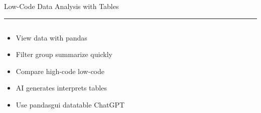 \documentclass[aspectratio=169]{beamer}
\newcommand{\TitleFont}{\rmfamily}
\begin{document}
\begin{frame}[t]{}
  \vspace*{0.5cm}
  {\TitleFont\fontsize{18}{22}\selectfont\color{LUBronze}Low-Code Data Analysis with Tables\par}
  \vspace{0.3em}
  {\color{LUBronze}\rule{\linewidth}{0.8pt}}\par
  \vspace{0.2cm}
  \begin{columns}[t]
    \begin{column}[t]{0.4\textwidth}
      \vspace*{0pt}
      \begin{itemize}\setlength\itemsep{0.65em}
        \item View data with pandas
        \item Filter group summarize quickly
        \item Compare high-code low-code
        \item AI generates interprets tables
        \item Use pandasgui datatable ChatGPT
      \end{itemize}
    \end{column}
  \end{columns}
\end{frame}
\end{document}
